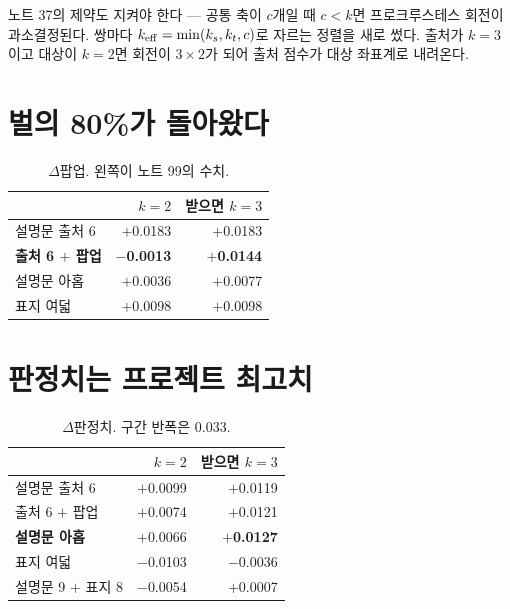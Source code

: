 \documentclass[10pt]{article}
\begin{document}
노트 37의 제약도 지켜야 한다 --- 공통 축이 $c$개일 때 $c<k$면 프로크루스테스
회전이 과소결정된다. 쌍마다 $k_{\rm eff}=\min(k_s, k_t, c)$로 자르는 정렬을
새로 썼다. 출처가 $k{=}3$이고 대상이 $k{=}2$면 회전이 $3\times2$가 되어 출처
점수가 대상 좌표계로 내려온다.

\section{벌의 80\%가 돌아왔다}

\begin{table}[t]
\centering\tsize
\caption{$\Delta$팝업. 왼쪽이 노트 99의 수치.}
\begin{tabular}{lrr}
\toprule
& $k{=}2$ & 받으면 $k{=}3$ \\
\midrule
설명문 출처 6 & $+$0.0183 & $+$0.0183 \\
\textbf{출처 6 $+$ 팝업} & \textbf{$-$0.0013} & \textbf{$+$0.0144} \\
설명문 아홉 & $+$0.0036 & $+$0.0077 \\
표지 여덟 & $+$0.0098 & $+$0.0098 \\
\bottomrule
\end{tabular}
\end{table}


\section{판정치는 프로젝트 최고치}

\begin{table}[t]
\centering\tsize
\caption{$\Delta$판정치. 구간 반폭은 0.033.}
\begin{tabular}{lrr}
\toprule
& $k{=}2$ & 받으면 $k{=}3$ \\
\midrule
설명문 출처 6 & $+$0.0099 & $+$0.0119 \\
출처 6 $+$ 팝업 & $+$0.0074 & $+$0.0121 \\
\textbf{설명문 아홉} & $+$0.0066 & \textbf{$+$0.0127} \\
표지 여덟 & $-$0.0103 & $-$0.0036 \\
설명문 9 $+$ 표지 8 & $-$0.0054 & $+$0.0007 \\
\bottomrule
\end{tabular}
\end{table}
\end{document}
